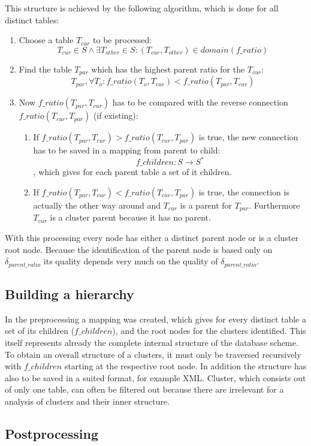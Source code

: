 \documentclass[10pt, journal, twocolumn]{IEEEtran}
\begin{document}
This structure is achieved by the following algorithm, which is done for all distinct tables: \begin{enumerate}
\item Choose a table $T_{cur}$ to be processed: $$T_{cur} \in S \wedge \exists T_{other} \in S: (T_{cur}, T_{other}) \in domain(f\_ratio)$$
\item Find the table $T_{par}$ which has the highest parent ratio for the $T_{cur}$: $$T_{par}, \forall T_{o}: f\_ratio(T_o, T_{cur}) < f\_ratio(T_{par},T_{cur}) $$
\item Now $f\_ratio(T_{par},T_{cur})$ has to be compared with the reverse connection $f\_ratio(T_{cur},T_{par})$ (if existing):
\begin{enumerate}
\item If $f\_ratio(T_{par},T_{cur}) > f\_ratio(T_{cur},T_{par})$ is true, the new connection has to be saved in a mapping from parent to child: $$f\_children: S \rightarrow S^*$$, which gives for each parent table a set of it children.
\item If $f\_ratio(T_{par},T_{cur}) < f\_ratio(T_{cur},T_{par})$ is true, the connection is actually the other way around and $T_{cur}$ is a parent for $T_{par}$. Furthermore $T_{cur}$ is a cluster parent because it has no parent.
\end{enumerate}
\end{enumerate}
With this processing every node has either a distinct parent node or is a cluster root node. Because the identification of the parent node is based only on $\delta_{parent\_ratio}$ its quality depends very much on the quality of $\delta_{parent\_ratio}$. 
\\\subsection{Building a hierarchy}
In the preprocessing a mapping was created, which gives for every distinct table a set of its children ($f\_children$), and the root nodes for the clusters identified. This itself represents already the complete internal structure of the database scheme. To obtain an overall structure of a clusters, it must only be traversed recursively with $f\_children$ starting at the respective root node. In addition the structure has also to be saved in a suited format, for example XML. Cluster, which consists out of only one table, can often be filtered out because there are irrelevant for a analysis of clusters and their inner structure. 
\\\subsection{Postprocessing}
\end{document}
